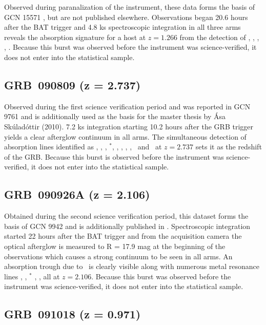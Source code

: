 \documentclass[longauth]{aa}    %
\begin{document}
Observed during paranalization of the instrument, these data forms the basis of
GCN 15571 \citep{GCN15571}, but are not published elsewhere. Observations began
20.6 hours after the BAT trigger and 4.8 ks spectroscopic integration in all
three arms reveals the absorption signature for a host at $z = 1.266$ from the
detection of \mgii, \mgi, \SIii, \feii, \aliii. Because this burst was observed
before the instrument was science-verified, it does not enter into the
statistical sample.

\subsection{GRB~090809 (z = 2.737)} \label{090809}

Observed during the first science verification period and was reported in GCN
9761 \citep{GCN.9761} and is additionally used as the basis for the master
thesis by \'Asa Sk\'ulad\'ottir (2010). 7.2 ks integration starting 10.2 hours
after the GRB trigger yields a clear afterglow continuum in all arms. The
simultaneous detection of absorption lines identified as \lya, \SIii, \oi,
\SIi$^*$, \SIiv, \civ, \feii, \alii, \aliii~and \mgii~at $z = 2.737$ sets it as
the redshift of the GRB. Because this burst is observed before the instrument
was science-verified, it does not enter into the statistical sample.

\subsection{GRB~090926A (z = 2.106)} \label{090926}

Obtained during the second science
verification period, this dataset forms the basis of GCN 9942 \citep{GCN.9942} and is
additionally published in \citet{DElia2010}. Spectroscopic integration started
22 hours after the BAT trigger and from the acquisition camera the optical
afterglow is measured to R = 17.9 mag at the beginning of the observations which
causes a strong continuum to be seen in all arms. An absorption trough due to
\lya~is clearly visible along with numerous metal resonance lines \civ, \SIii,
\SIii$^*$ \feii, \mgii, all at $z = 2.106$. Because this burst was observed
before the instrument was science-verified, it does not enter into the
statistical sample.

\subsection{GRB~091018 (z = 0.971)}\label{091018}
\end{document}
